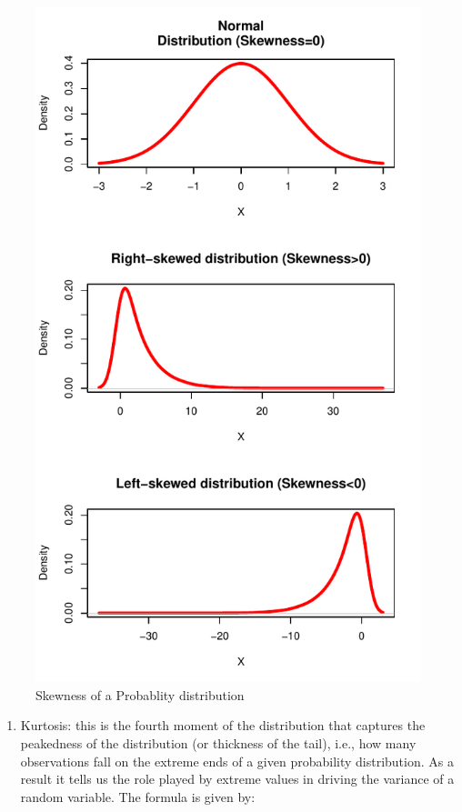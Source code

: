 \documentclass[]{book}
\providecommand{\tightlist}{%
  \setlength{\itemsep}{0pt}\setlength{\parskip}{0pt}}
\theoremstyle{definition}
\theoremstyle{definition}
\theoremstyle{definition}
\theoremstyle{remark}
\begin{document}
\begin{figure}

{\centering \includegraphics{bookdown-demo_files/figure-latex/unnamed-chunk-53-1} 

}

\caption{Skewness of a Probablity distribution}\label{fig:unnamed-chunk-53}
\end{figure}

\begin{enumerate}
\def\labelenumi{\arabic{enumi}.}
\setcounter{enumi}{1}
\tightlist
\item
  Kurtosis: this is the fourth moment of the distribution that captures the peakedness of the distribution (or thickness of the tail), i.e., how many observations fall on the extreme ends of a given probability distribution. As a result it tells us the role played by extreme values in driving the variance of a random variable. The formula is given by:
\end{enumerate}
\end{document}
